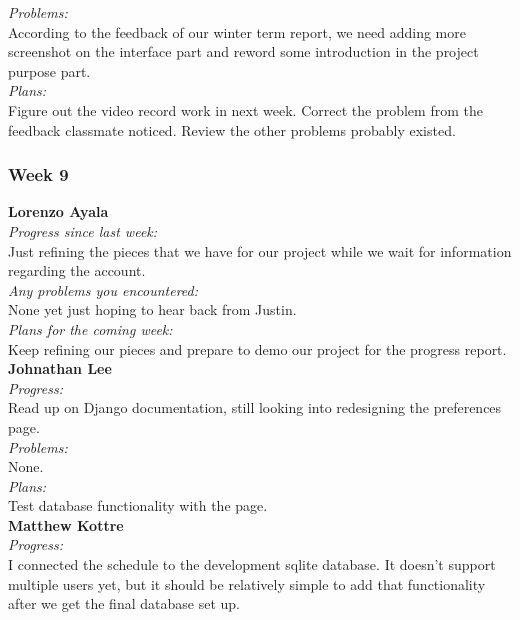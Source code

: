 \noindent\textit{Problems:}\\
\noindent  According to the feedback of our winter term report, we need adding more screenshot on the interface part and reword some introduction in the project purpose part.\\

\noindent\textit{Plans:}\\
\noindent Figure out the video record work in next week. Correct the problem from the feedback classmate noticed. Review the other problems probably existed.\\

\subsubsection{Week 9}

\textbf{Lorenzo Ayala}\\
\noindent\textit{Progress since last week:}\\
Just refining the pieces that we have for our project while we wait for information regarding the account.\\

\noindent\textit{Any problems you encountered:}\\
\noindent None yet just hoping to hear back from Justin.\\

\noindent\textit{Plans for the coming week:}\\
\noindent Keep refining our pieces and prepare to demo our project for the progress report.\\

\noindent\textbf{Johnathan Lee}\\
\noindent\textit{Progress:}\\
Read up on Django documentation, still looking into redesigning the preferences page. \\ 

\noindent\textit{Problems:}\\
\noindent None.\\

\noindent\textit{Plans:}\\
\noindent Test database functionality with the page.\\

\noindent\textbf{Matthew Kottre}\\
\noindent\textit{Progress:}\\
I connected the schedule to the development sqlite database. It doesn't support multiple users yet, but it should be relatively simple to add that functionality after we get the final database set up.\\

